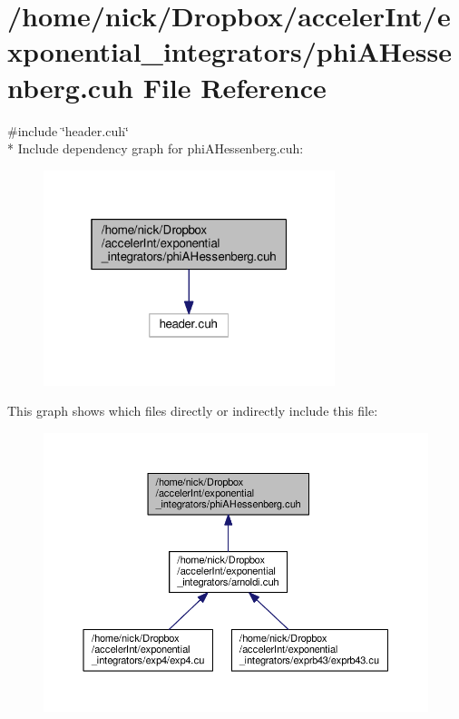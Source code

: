 \hypertarget{phiAHessenberg_8cuh}{}\section{/home/nick/\+Dropbox/acceler\+Int/exponential\+\_\+integrators/phi\+A\+Hessenberg.cuh File Reference}
\label{phiAHessenberg_8cuh}
{\ttfamily \#include \char`\"{}header.\+cuh\char`\"{}}\\*
Include dependency graph for phi\+A\+Hessenberg.\+cuh\+:
\nopagebreak
\begin{figure}[H]
\begin{center}
\leavevmode
\includegraphics[width=241pt]{phiAHessenberg_8cuh__incl}
\end{center}
\end{figure}
This graph shows which files directly or indirectly include this file\+:
\nopagebreak
\begin{figure}[H]
\begin{center}
\leavevmode
\includegraphics[width=350pt]{phiAHessenberg_8cuh__dep__incl}
\end{center}
\end{figure}
